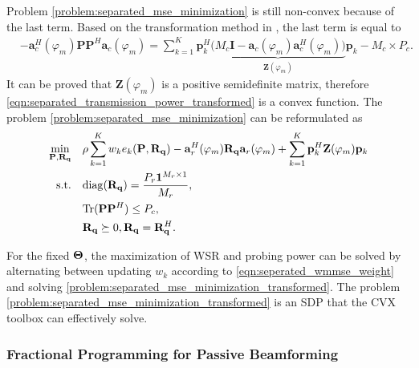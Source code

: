 Problem \eqref{problem:separated_mse_minimization} is still non-convex because of the last term. Based on the
transformation method in \cite{xu2020tradeoff}, the last term is equal to
\begin{align} \label{eqn:separated_transmission_power_transformed}
    &- \mathbf{a}_c^H(\varphi_m)\mathbf{P} \mathbf{P}^H \mathbf{a}_c(\varphi_m) =\sum_{k=1}^K \mathbf{p}_k^H \underbrace{\Big(M_c \mathbf{I} - \mathbf{a}_c(\varphi_m)\mathbf{a}_c^H(\varphi_m)\Big)}_{\mathbf{Z}(\varphi_m)}\mathbf{p}_k-M_c\times P_c.
\end{align}
It can be proved that ${\mathbf{Z}(\varphi_m)}$ is a positive semidefinite matrix,
therefore \eqref{eqn:separated_transmission_power_transformed} is a convex function. The problem \eqref{problem:separated_mse_minimization} can be reformulated as
\begin{subequations} \label{problem:separated_mse_minimization_transformed}
    \begin{align}
        \min_{\mathbf{P},\mathbf{R}_{\bf q}} \quad & \rho\sum_{k=1}^K w_k e_k(\mathbf{P},\mathbf{R}_{\bf q})- \mathbf{a}_r^H(\varphi_m)\mathbf{R}_{\bf q}\mathbf{a}_r(\varphi_m) +\sum_{k=1}^K\mathbf{p}_k^H \mathbf{Z}(\varphi_m)\mathbf{p}_k \\
        \mathrm{s.t.} \quad &\mathrm{diag}(\mathbf{R}_{\bf q}) = \frac{P_r \mathbf{1}^{M_r \times 1}}{M_r}, \\ 
        &\mathrm{Tr} (\mathbf{P}\mathbf{P}^H) \leq P_c ,\\ 
        & \mathbf{R}_{\bf q} \succeq 0, {\bf R}_{\bf q} = {\bf R}_{\bf q}^H .
    \end{align}
\end{subequations}

For the fixed $\bf{\Theta}$, the maximization of WSR and probing power can be solved by alternating 
between updating $w_k$ according to \eqref{eqn:seperated_wmmse_weight} and solving \eqref{problem:separated_mse_minimization_transformed}. 
The problem \eqref{problem:separated_mse_minimization_transformed} is an SDP that the CVX toolbox \cite{cvx} can effectively solve.


\subsubsection{Fractional Programming for Passive Beamforming} \label{sec:FP_separated}

